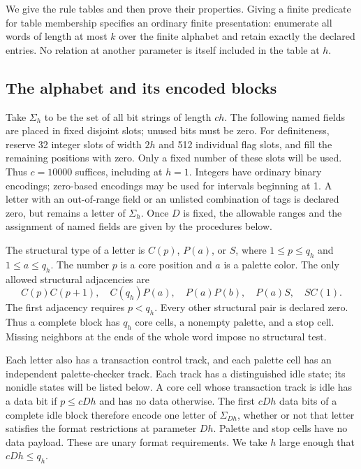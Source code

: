 We give the rule tables and then prove their properties.  Giving a
finite predicate for table membership specifies an ordinary finite
presentation: enumerate all words of length at most $k$ over the
finite alphabet and retain exactly the declared entries.  No relation
at another parameter is itself included in the table at $h$.

\subsection{The alphabet and its encoded blocks}
\label{fr:formats}

Take $\Sigma_h$ to be the set of all bit strings of length $ch$.
The following named
fields are placed in fixed disjoint slots; unused bits must be zero.
For definiteness, reserve 32 integer slots of width $2h$ and 512
individual flag slots, and fill the remaining positions with zero.
Only a fixed number of these slots will be used.  Thus $c=10000$
suffices, including at $h=1$.  Integers have ordinary binary encodings;
zero-based encodings may be used for intervals beginning at 1.  A
letter with an out-of-range field or an unlisted combination of tags
is declared zero, but remains a letter of $\Sigma_h$. Once $D$ is fixed,
the allowable ranges and the
assignment of named fields are given by the procedures below.

The structural type of a letter is $C(p)$, $P(a)$, or $S$, where
$1\leq p\leq q_h$ and $1\leq a\leq q_h$.  The number $p$ is a core
position and $a$ is a palette color.  The only allowed structural
adjacencies are
\begin{equation}\label{fr:structural-pairs}
 C(p)C(p+1),\quad C(q_h)P(a),\quad P(a)P(b),\quad P(a)S,
 \quad SC(1).
\end{equation}
The first adjacency requires $p<q_h$.  Every other structural pair is
declared zero.  Thus a complete block has $q_h$ core cells, a nonempty
palette, and a stop cell.  Missing neighbors at the ends of the whole
word impose no structural test.

Each letter also has a transaction control track, and each palette cell
has an independent palette-checker track. Each track has a distinguished
idle state; its nonidle states will be listed below. A core cell whose
transaction track is idle has a data bit if $p\leq cDh$ and has no data
otherwise. The first $cDh$ data bits of a complete idle block therefore
encode one letter of $\Sigma_{Dh}$, whether or not that letter satisfies
the format restrictions at parameter $Dh$. Palette and stop cells have
no data payload. These are unary format requirements. We take $h$
large enough that $cDh\leq q_h$.

